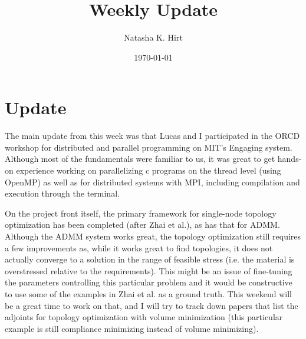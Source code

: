 \documentclass[12pt]{article}
\title{Weekly Update}
\author{Natasha K. Hirt}
\date{\today}
\begin{document}
\maketitle

\section{Update}

The main update from this week was that Lucas and I participated in the ORCD workshop for distributed and parallel programming on MIT's Engaging system. Although most of the fundamentals were familiar to us, it was great to get hands-on experience working on parallelizing c programs on the thread level (using OpenMP) as well as for distributed systems with MPI, including compilation and execution through the terminal. 

On the project front itself, the primary framework for single-node topology optimization has been completed (after Zhai et al.), as has that for ADMM. Although the ADMM system works great, the topology optimization still requires a few improvements as, while it works great to find topologies, it does not actually converge to a solution in the range of feasible stress (i.e. the material is overstressed relative to the requirements). This might be an issue of fine-tuning the parameters controlling this particular problem and it would be constructive to use some of the examples in Zhai et al. as a ground truth. This weekend will be a great time to work on that, and I will try to track down papers that list the adjoints for topology optimization with volume minimization (this particular example is still compliance minimizing instead of volume minimizing).
\end{document}
